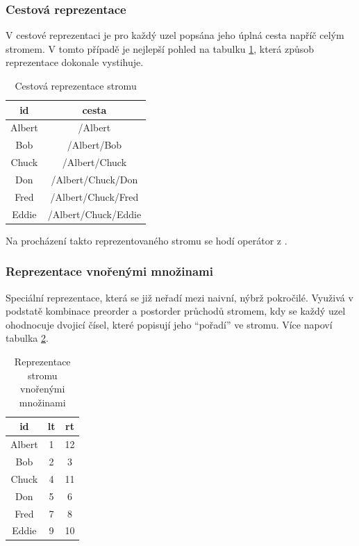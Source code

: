 
\subsubsection{Cestová reprezentace}
V cestové reprezentaci je pro každý uzel popsána jeho úplná cesta napříč celým stromem. V tomto případě je nejlepší pohled na tabulku \ref{tab:str2}, která způsob reprezentace dokonale vystihuje.

\begin{table}
\centering
\caption{Cestová reprezentace stromu}\label{tab:str2}
\begin{tabular}{c | c}
id & cesta \\
\hline
Albert & /Albert \\
Bob & /Albert/Bob \\
Chuck & /Albert/Chuck \\
Don & /Albert/Chuck/Don \\
Fred & /Albert/Chuck/Fred \\
Eddie & /Albert/Chuck/Eddie
\end{tabular}
\end{table}

Na procházení takto reprezentovaného stromu se hodí operátor z .

\subsubsection{Reprezentace vnořenými množinami}
Speciální reprezentace, která se již neřadí mezi naivní, nýbrž pokročilé. Využivá v podstatě kombinace preorder a postorder průchodů stromem, kdy se každý uzel ohodnocuje dvojicí čísel, které popisují jeho \enquote{pořadí} ve stromu. Více napoví tabulka \ref{tab:str3}.

\begin{table}
\centering
\caption{Reprezentace stromu vnořenými množinami}\label{tab:str3}
\begin{tabular}{c | c c}
id & lt & rt \\
\hline
Albert & 1 & 12 \\
Bob & 2 & 3 \\
Chuck & 4 & 11 \\
Don & 5 & 6 \\
Fred & 7 & 8 \\
Eddie & 9 & 10
\end{tabular}
\end{table}


